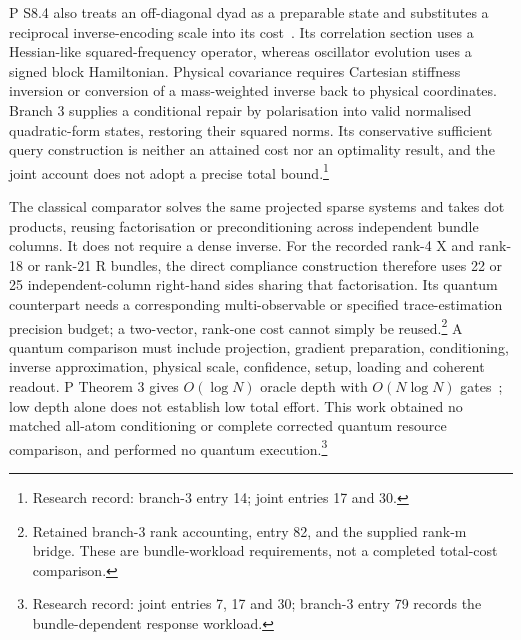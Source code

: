 \documentclass{article}
\begin{document}
P S8.4 also treats an off-diagonal dyad as a preparable state and substitutes a reciprocal inverse-encoding scale into its cost~\cite{P}. Its correlation section uses a Hessian-like squared-frequency operator, whereas oscillator evolution uses a signed block Hamiltonian. Physical covariance requires Cartesian stiffness inversion or conversion of a mass-weighted inverse back to physical coordinates. Branch 3 supplies a conditional repair by polarisation into valid normalised quadratic-form states, restoring their squared norms. Its conservative sufficient query construction is neither an attained cost nor an optimality result, and the joint account does not adopt a precise total bound.\footnote{Research record: branch-3 entry 14; joint entries 17 and 30.}

The classical comparator solves the same projected sparse systems and takes dot products, reusing factorisation or preconditioning across independent bundle columns. It does not require a dense inverse. For the recorded rank-4 X and rank-18 or rank-21 R bundles, the direct compliance construction therefore uses 22 or 25 independent-column right-hand sides sharing that factorisation. Its quantum counterpart needs a corresponding multi-observable or specified trace-estimation precision budget; a two-vector, rank-one cost cannot simply be reused.\footnote{Retained branch-3 rank accounting, entry 82, and the supplied rank-m bridge. These are bundle-workload requirements, not a completed total-cost comparison.} A quantum comparison must include projection, gradient preparation, conditioning, inverse approximation, physical scale, confidence, setup, loading and coherent readout. P Theorem 3 gives \(O(\log N)\) oracle depth with \(O(N\log N)\) gates~\cite{P}; low depth alone does not establish low total effort. This work obtained no matched all-atom conditioning or complete corrected quantum resource comparison, and performed no quantum execution.\footnote{Research record: joint entries 7, 17 and 30; branch-3 entry 79 records the bundle-dependent response workload.}
\end{document}
